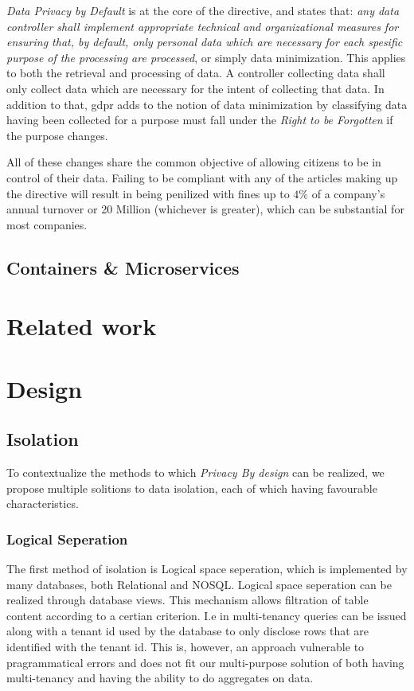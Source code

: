\documentclass[USenglish]{uit-thesis}
\begin{document}
\textit{Data Privacy by Default} is at the core of the directive, and states
that: \textit{any data controller shall implement appropriate technical and organizational
measures for ensuring that, by default, only personal data which are necessary for each spesific
purpose of the processing are processed}, or simply data minimization.
This applies to both the retrieval and processing of data.
A controller collecting data shall only collect data which are necessary for the intent
of collecting that data.
In addition to that, \gls{gdpr} adds to the notion of data minimization by classifying
data having been collected for a purpose must fall under the \textit{Right to be Forgotten}
if the purpose changes.



All of these changes share the common objective of allowing citizens to
be in control of their data.
Failing to be compliant with any of the articles making up the
directive will result in being penilized with fines up to $ 4\% $ of a company's annual turnover
or 20 Million (whichever is greater), which can be substantial for most companies.
\section{Containers \& Microservices}

\chapter{Related work}


\chapter{Design}
\section{Isolation}
To contextualize the methods to which \textit{Privacy By design} can be realized, we
propose multiple solitions to data isolation, each of which having favourable characteristics.

\subsection{Logical Seperation}
The first method of isolation is Logical space seperation, which is implemented
by many databases, both Relational and NOSQL.
Logical space seperation can be realized through database views.
This mechanism allows filtration of table content according to a certian criterion.
I.e in multi-tenancy queries can be issued along with a tenant id used by the database
to only disclose rows that are identified with the tenant id.
This is, however, an approach vulnerable to pragrammatical errors and does not fit our
multi-purpose solution of both having multi-tenancy and having the ability to do aggregates
on data.
\end{document}
